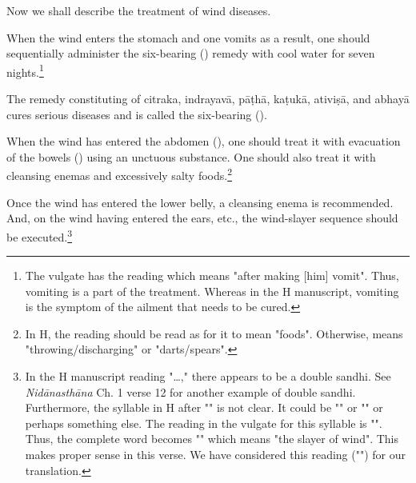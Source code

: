 \begin{translation}
    
    \item [1] 
    Now we shall describe the treatment of wind diseases.
    
    \item [2]

    \item [3]
    When the wind enters the stomach and one vomits as a result, one should sequentially administer the six-bearing () remedy with cool water for seven nights.\footnote{The vulgate has the reading  which means "after making [him] vomit". Thus, vomiting is a part of the treatment. Whereas in the H manuscript, vomiting is the symptom of the ailment that needs to be cured.}

    \item [4]
    The remedy constituting of \gls{citraka}, \gls{indrayavā}, \gls{pāṭhā}, \gls{kaṭukā}, \gls{ativiṣā}, and \gls{abhayā} cures serious diseases and is called the six-bearing ().

    \item [5]
    When the wind has entered the abdomen (), one should treat it with evacuation of the bowels () using an unctuous substance. One should also treat it with cleansing enemas and excessively salty foods.\footnote{In H, the reading  should be read as  for it to mean "foods". Otherwise,  means "throwing/discharging" or "darts/spears".} 

    \item [6]
    Once the wind has entered the lower belly, a cleansing enema is recommended. And, on the wind having entered the ears, etc., the wind-slayer sequence should be executed.\footnote{In the H manuscript reading "\ldots," there appears to be a double sandhi. %
    See \textit{Nidānasthāna} Ch. 1 verse 12 for another example of double sandhi.
    Furthermore, the syllable in H after "" is not clear. It could be "" or "" or perhaps something else. The reading in the vulgate for this syllable is "". Thus, the complete word becomes "" which means "the slayer of wind". This makes proper sense in this verse. We have considered this reading ("") for our translation.}    


\end{translation}
